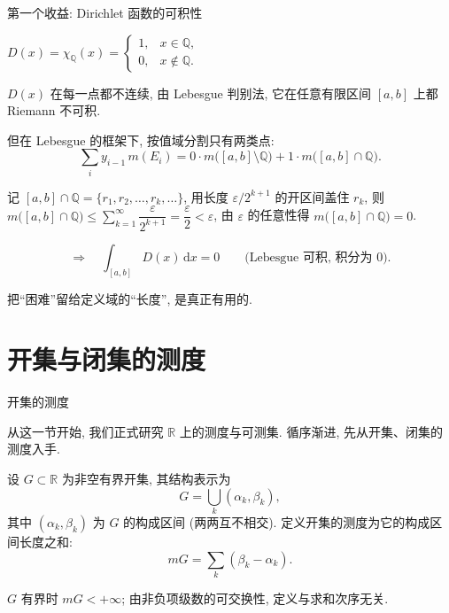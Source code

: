 \begin{frame}{第一个收益: Dirichlet 函数的可积性}

\begin{eg}[Dirichlet 函数]
$D(x) = \chi_{\mathbb{Q}}(x) = \begin{cases} 1, & x \in \mathbb{Q}, \\ 0, & x \notin \mathbb{Q}. \end{cases}$

$D(x)$ 在每一点都不连续, 由 Lebesgue 判别法, 它在任意有限区间 $[a,b]$ 上都 Riemann 不可积.
\end{eg}

\pause

但在 Lebesgue 的框架下, 按值域分割只有两类点:
\[
\sum_i y_{i-1}\, m(E_i) = 0 \cdot m\big([a,b] \setminus \mathbb{Q}\big) + 1 \cdot m\big([a,b] \cap \mathbb{Q}\big).
\]

\pause

记 $[a,b] \cap \mathbb{Q} = \{r_1, r_2, \ldots, r_k, \ldots\}$, 用长度 $\varepsilon/2^{k+1}$ 的开区间盖住 $r_k$, 则
$m\big([a,b] \cap \mathbb{Q}\big) \leqslant \sum_{k=1}^\infty \dfrac{\varepsilon}{2^{k+1}} = \dfrac{\varepsilon}{2} < \varepsilon$, 由 $\varepsilon$ 的任意性得 $m\big([a,b] \cap \mathbb{Q}\big) = 0$.

\[
\Longrightarrow \quad \int_{[a,b]} D(x)\,\mathrm{d}x = 0 \qquad \text{(Lebesgue 可积, 积分为 $0$)}.
\]

\begin{attnblock}
把``困难''留给定义域的``长度'', 是真正有用的.
\end{attnblock}

\end{frame}


\section[开闭集测度]{开集与闭集的测度}


\begin{frame}{开集的测度}

从这一节开始, 我们正式研究 $\mathbb{R}$ 上的测度与可测集. 循序渐进, \alert{先从开集、闭集的测度入手}.

\pause

\begin{Def}[开集的测度]
设 $G \subset \mathbb{R}$ 为非空有界开集, 其结构表示为
\[
G = \bigcup_k (\alpha_k, \beta_k),
\]
其中 $(\alpha_k, \beta_k)$ 为 $G$ 的构成区间 (两两互不相交). 定义\alert{开集的测度}为它的构成区间长度之和:
\[
m G = \sum_k (\beta_k - \alpha_k).
\]
\end{Def}

\begin{remark}
$G$ 有界时 $m G < +\infty$; 由非负项级数的可交换性, 定义与求和次序无关.
\end{remark}

\end{frame}

